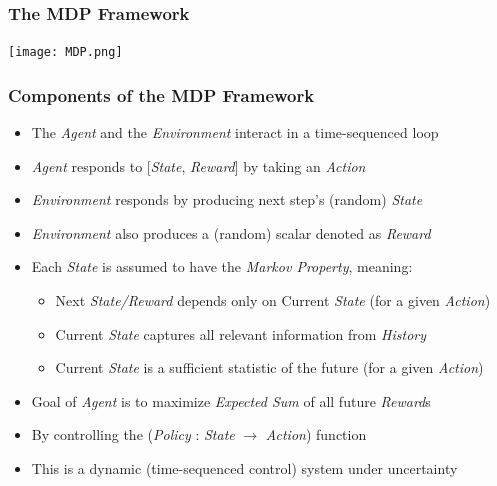 \documentclass[handout]{beamer}
\begin{document}
\begin{frame}
\frametitle{The MDP Framework}
\texttt{[image: MDP.png]}
\end{frame}

\begin{frame}
\frametitle{Components of the MDP Framework}
\pause
\begin{itemize}[<+->]
\item The {\em Agent} and the {\em Environment} interact in a time-sequenced loop
\item {\em Agent} responds to [{\em State}, {\em Reward}] by taking an {\em Action}
\item {\em Environment} responds by producing next step's (random) {\em State}
\item {\em Environment} also produces a (random) scalar denoted as {\em Reward}
\item Each {\em State} is assumed to have the {\em Markov Property}, meaning:
\begin{itemize}
\item Next {\em State/Reward} depends only on Current {\em State} (for a given {\em Action})
\item Current {\em State} captures all relevant information from {\em History}
\item Current {\em State} is a sufficient statistic of the future (for a given {\em Action})
\end{itemize} 
\item Goal of {\em Agent} is to maximize {\em Expected Sum} of all future {\em Reward}s
\item By controlling the ({\em Policy} : {\em State} $\rightarrow$ {\em Action}) function
\item This is a dynamic (time-sequenced control) system under uncertainty
\end{itemize}
\end{frame}
\end{document}
